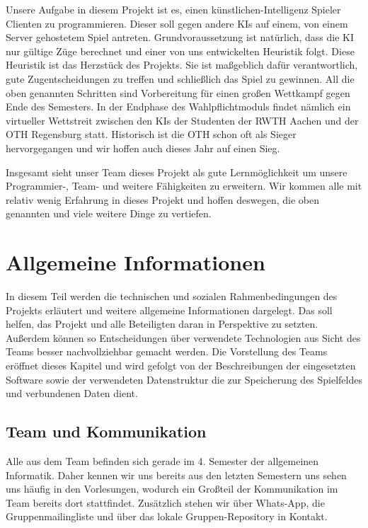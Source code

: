 \documentclass[12pt,a4paper,bibliography=totocnumbered,listof=totocnumbered]{scrartcl}
\begin{document}
    Unsere Aufgabe in diesem Projekt ist es, einen künstlichen-Intelligenz Spieler Clienten zu programmieren. Dieser soll gegen andere KIs auf einem, von einem Server gehostetem Spiel antreten. Grundvoraussetzung ist natürlich, dass die KI nur gültige Züge berechnet und einer von uns entwickelten Heuristik folgt. Diese Heuristik ist das Herzstück des Projekts. Sie ist maßgeblich dafür verantwortlich, gute Zugentscheidungen zu treffen und schließlich das Spiel zu gewinnen. All die oben genannten Schritten sind Vorbereitung für einen großen Wettkampf gegen Ende des Semesters. In der Endphase des Wahlpflichtmoduls findet nämlich ein virtueller Wettstreit zwischen den KIs der Studenten der RWTH Aachen und der OTH Regensburg statt. Historisch ist die OTH schon oft als Sieger hervorgegangen und wir hoffen auch dieses Jahr auf einen Sieg.

    Insgesamt sieht unser Team dieses Projekt als gute Lernmöglichkeit um unsere Programmier-, Team- und weitere Fähigkeiten zu erweitern. Wir kommen alle mit relativ wenig Erfahrung in dieses Projekt und hoffen deswegen, die oben genannten und viele weitere Dinge zu vertiefen.

    \newpage
    \section{Allgemeine Informationen}
    \vspace{1em}

    In diesem Teil werden die technischen und sozialen Rahmenbedingungen des Projekts erläutert und weitere allgemeine Informationen dargelegt. Das soll helfen, das Projekt und alle Beteiligten daran in Perspektive zu setzten. Außerdem können so Entscheidungen über verwendete Technologien aus Sicht des Teams besser nachvollziehbar gemacht werden. Die Vorstellung des Teams eröffnet dieses Kapitel und wird gefolgt von der Beschreibungen der eingesetzten Software sowie der verwendeten Datenstruktur die zur Speicherung des Spielfeldes und verbundenen Daten dient.

    \subsection{Team und Kommunikation}
    \vspace{1em}
    Alle aus dem Team befinden sich gerade im 4. Semester der allgemeinen Informatik. Daher kennen wir uns bereits aus den letzten Semestern uns sehen uns häufig in den Vorlesungen, wodurch ein Großteil der Kommunikation im Team bereits dort stattfindet. Zusätzlich stehen wir über Whats-App, die Gruppenmailingliste und über das lokale Gruppen-Repository in Kontakt.
\end{document}
